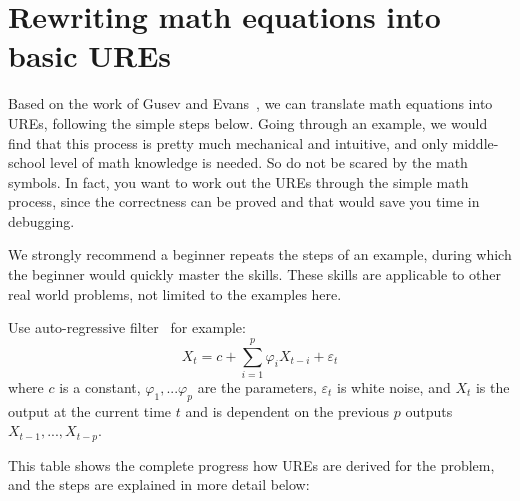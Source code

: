 \chapter{Rewriting math equations into basic UREs}

Based on the work of Gusev and Evans~\cite{broadcastElim,broadcastElimQR},  we can translate math equations into UREs, following the simple steps below. Going through an example, we would find that this process is pretty much mechanical and intuitive, and only middle-school level of math knowledge is needed. So do not be scared by the math symbols. In fact, you want to work out the UREs through the simple math process, since the correctness can be proved and that would save you time in debugging.

We strongly recommend a beginner repeats the steps of an example, during which the beginner would quickly master the skills. These skills are applicable to other real world problems, not limited to the examples here.

Use auto-regressive filter~\cite{autoRegressiveModel} for example:
\begin{equation}
 X_t=c+\sum\limits^p_{i=1}\varphi_i X_{t-i}+\varepsilon_t
\end{equation}
where $c$ is a constant, $\varphi_1, ... \varphi_p$ are the parameters, $\varepsilon _t$ is white noise, and $X_t$ is the output at the current time $t$ and is dependent on the previous $p$ outputs $ X_{t-1}, ..., X_{t-p}$. 

This table shows the complete progress how UREs are derived for the problem, and the steps are explained in more detail below:

